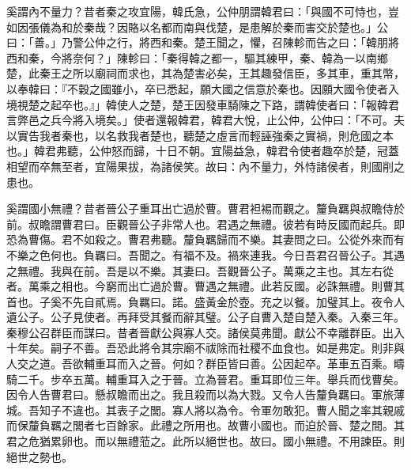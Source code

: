 \begin{pinyinscope}
奚謂內不量力？昔者秦之攻宜陽，韓氏急，公仲朋謂韓君曰：「與國不可恃也，豈如因張儀為和於秦哉？因賂以名都而南與伐楚，是患解於秦而害交於楚也。」公曰：「善。」乃警公仲之行，將西和秦。楚王聞之，懼，召陳軫而告之曰：「韓朋將西和秦，今將奈何？」陳軫曰：「秦得韓之都一，驅其練甲，秦、韓為一以南鄉楚，此秦王之所以廟祠而求也，其為楚害必矣，王其趣發信臣，多其車，重其幣，以奉韓曰：『不穀之國雖小，卒已悉起，願大國之信意於秦也。因願大國令使者入境視楚之起卒也。』」韓使人之楚，楚王因發車騎陳之下路，謂韓使者曰：「報韓君言弊邑之兵今將入境矣。」使者還報韓君，韓君大悅，止公仲，公仲曰：「不可。夫以實告我者秦也，以名救我者楚也，聽楚之虛言而輕誣強秦之實禍，則危國之本也。」韓君弗聽，公仲怒而歸，十日不朝。宜陽益急，韓君令使者趣卒於楚，冠蓋相望而卒無至者，宜陽果拔，為諸侯笑。故曰：內不量力，外恃諸侯者，則國削之患也。

奚謂國小無禮？昔者晉公子重耳出亡過於曹。曹君袒裼而觀之。釐負羈與叔瞻侍於前。叔瞻謂曹君曰。臣觀晉公子非常人也。君遇之無禮。彼若有時反國而起兵。即恐為曹傷。君不如殺之。曹君弗聽。釐負羈歸而不樂。其妻問之曰。公從外來而有不樂之色何也。負羈曰。吾聞之。有福不及。禍來連我。今日吾君召晉公子。其遇之無禮。我與在前。吾是以不樂。其妻曰。吾觀晉公子。萬乘之主也。其左右從者。萬乘之相也。今窮而出亡過於曹。曹遇之無禮。此若反國。必誅無禮。則曹其首也。子奚不先自貳焉。負羈曰。諾。盛黃金於壺。充之以餐。加璧其上。夜令人遺公子。公子見使者。再拜受其餐而辭其璧。公子自曹入楚自楚入秦。入秦三年。秦穆公召群臣而謀曰。昔者晉獻公與寡人交。諸侯莫弗聞。獻公不幸離群臣。出入十年矣。嗣子不善。吾恐此將令其宗廟不祓除而社稷不血食也。如是弗定。則非與人交之道。吾欲輔重耳而入之晉。何如？群臣皆曰善。公因起卒。革車五百乘。疇騎二千。步卒五萬。輔重耳入之于晉。立為晉君。重耳即位三年。舉兵而伐曹矣。因令人告曹君曰。懸叔瞻而出之。我且殺而以為大戮。又令人告釐負羈曰。軍旅薄城。吾知子不違也。其表子之閭。寡人將以為令。令軍勿敢犯。曹人聞之率其親戚而保釐負羈之閭者七百餘家。此禮之所用也。故曹小國也。而迫於晉、楚之間。其君之危猶累卵也。而以無禮蒞之。此所以絕世也。故曰。國小無禮。不用諫臣。則絕世之勢也。


\end{pinyinscope}